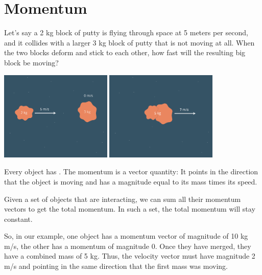 \chapter{Momentum}

Let's say a 2 kg block of putty is flying through space at 5 meters
per second, and it collides with a larger 3 kg block of putty that is not
moving at all. When the two blocks deform and stick to each other, how
fast will the resulting big block be moving?

\includegraphics[width=0.4\textwidth]{putty1.png}
\includegraphics[width=0.4\textwidth]{putty2.png}


Every object has .  The momentum is a vector
quantity: It points in the direction that the object is moving and has
a magnitude equal to its mass times its speed.

Given a set of objects that are interacting, we can sum all their
momentum vectors to get the total momentum.  In such a set, the total
momentum will stay constant.

So, in our example, one object has a momentum vector of magnitude of
10 kg m/s, the other has a momentum of magnitude 0.  Once they have
merged, they have a combined mass of 5 kg.  Thus, the velocity vector
must have magnitude 2 m/s and pointing in the same direction that the
first mass was moving.

